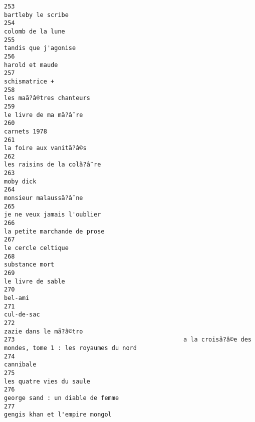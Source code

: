 \documentclass[
]{report}
\begin{document}
\begin{verbatim}
253                                                                                      bartleby le scribe
254                                                                                       colomb de la lune
255                                                                                    tandis que j'agonise
256                                                                                         harold et maude
257                                                                                          schismatrice +
258                                                                                les maã?â®tres chanteurs
259                                                                                  le livre de ma mã?â¨re
260                                                                                            carnets 1978
261                                                                                 la foire aux vanitã?â©s
262                                                                             les raisins de la colã?â¨re
263                                                                                               moby dick
264                                                                                  monsieur malaussã?â¨ne
265                                                                             je ne veux jamais l'oublier
266                                                                            la petite marchande de prose
267                                                                                      le cercle celtique
268                                                                                          substance mort
269                                                                                       le livre de sable
270                                                                                                 bel-ami
271                                                                                              cul-de-sac
272                                                                                  zazie dans le mã?â©tro
273                                               a la croisã?â©e des mondes, tome 1 : les royaumes du nord
274                                                                                               cannibale
275                                                                                les quatre vies du saule
276                                                                        george sand : un diable de femme
277                                                                          gengis khan et l'empire mongol

\end{verbatim}
\end{document}
